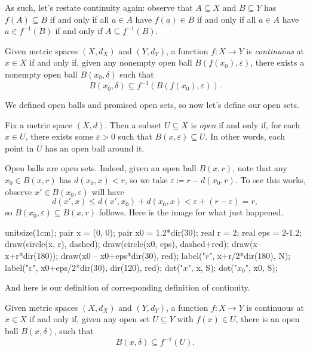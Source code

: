 \documentclass[../notes.tex]{subfiles}
\begin{document}
As such, let's restate continuity again: observe that $A\subseteq X$ and $B\subseteq Y$ has $f(A)\subseteq B$ if and only if all $a\in A$ have $f(a)\in B$ if and only if all $a\in A$ have $a\in f^{-1}(B)$ if and only if $A\subseteq f^{-1}(B)$.
\begin{defihelper}[Continuous]
	Given metric spaces $(X,d_X)$ and $(Y,d_Y)$, a function $f\colon X\to Y$ is \textit{continuous} at $x\in X$ if and only if, given any nonempty open ball $B(f(x_0),\varepsilon)$, there exists a nonempty open ball $B(x_0,\delta)$ such that
	\[B(x_0,\delta)\subseteq f^{-1}(B(f(x_0),\varepsilon)).\]
\end{defihelper}
We defined open balls and promised open sets, so now let's define our open sets.
\begin{definition}
	Fix a metric space $(X,d)$. Then a subset $U\subseteq X$ is \textit{open} if and only if, for each $x\in U$, there exists some $\varepsilon>0$ such that $B(x,\varepsilon)\subseteq U$. In other words, each point in $U$ has an open ball around it.
\end{definition}
\begin{example} \label{ex:openballisopen}
	Open balls are open sets. Indeed, given an open ball $B(x,r)$, note that any $x_0\in B(x,r)$ has $d(x_0,x)<r$, so we take $\varepsilon\coloneqq r-d(x_0,r)$. To see this works, observe $x'\in B(x_0,\varepsilon)$ will have
	\[d(x',x)\le d(x',x_0)+d(x_0,x)<\varepsilon+(r-\varepsilon)=r,\]
	so $B(x_0,\varepsilon)\subseteq B(x,r)$ follows. Here is the image for what just happened.
	\begin{center}
		\begin{asy}
			unitsize(1cm);
			pair x = (0, 0);
			pair x0 = 1.2*dir(30);
			real r = 2;
			real eps = 2-1.2;
			draw(circle(x, r), dashed);
			draw(circle(x0, eps), dashed+red);
			draw(x--x+r*dir(180));
			draw(x0 -- x0+eps*dir(30), red);
			label("$r$", x+r/2*dir(180), N);
			label("$\varepsilon$", x0+eps/2*dir(30), dir(120), red);
			dot("$x$", x, S);
			dot("$x_0$", x0, S);
		\end{asy}
	\end{center}
\end{example}
And here is our definition of corresponding definition of continuity.
\begin{lemma} \label{lem:goodcont1}
	Given metric spaces $(X,d_X)$ and $(Y,d_Y)$, a function $f\colon X\to Y$ is continuous at $x\in X$ if and only if, given any open set $U\subseteq Y$ with $f(x)\in U$, there is an open ball $B(x,\delta)$, such that
	\[B(x,\delta)\subseteq f^{-1}(U).\]
\end{lemma}
\end{document}
